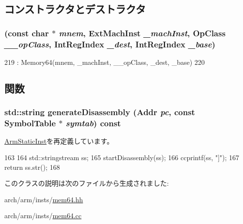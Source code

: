 \subsection{コンストラクタとデストラクタ}
\hypertarget{classArmISA_1_1MemoryRaw64_a03756ab9aa27dce182b70468c4b3d623}{
\subsubsection[{MemoryRaw64}]{ (const char $\ast$ {\em mnem}, \/  {\bf ExtMachInst} {\em \_\-machInst}, \/  OpClass {\em \_\-\_\-opClass}, \/  {\bf IntRegIndex} {\em \_\-dest}, \/  {\bf IntRegIndex} {\em \_\-base})}}
\label{classArmISA_1_1MemoryRaw64_a03756ab9aa27dce182b70468c4b3d623}



\begin{DoxyCode}
219         : Memory64(mnem, _machInst, __opClass, _dest, _base)
220     {}
\end{DoxyCode}


\subsection{関数}
\hypertarget{classArmISA_1_1MemoryRaw64_a95d323a22a5f07e14d6b4c9385a91896}{
\subsubsection[{generateDisassembly}]{\setlength{\rightskip}{0pt plus 5cm}std::string generateDisassembly ({\bf Addr} {\em pc}, \/  const SymbolTable $\ast$ {\em symtab}) const}}
\label{classArmISA_1_1MemoryRaw64_a95d323a22a5f07e14d6b4c9385a91896}


\hyperlink{classArmISA_1_1ArmStaticInst_a95d323a22a5f07e14d6b4c9385a91896}{ArmStaticInst}を再定義しています。


\begin{DoxyCode}
163 {
164     std::stringstream ss;
165     startDisassembly(ss);
166     ccprintf(ss, "]");
167     return ss.str();
168 }
\end{DoxyCode}


このクラスの説明は次のファイルから生成されました:\begin{DoxyCompactItemize}
\item 
arch/arm/insts/\hyperlink{mem64_8hh}{mem64.hh}\item 
arch/arm/insts/\hyperlink{mem64_8cc}{mem64.cc}\end{DoxyCompactItemize}
